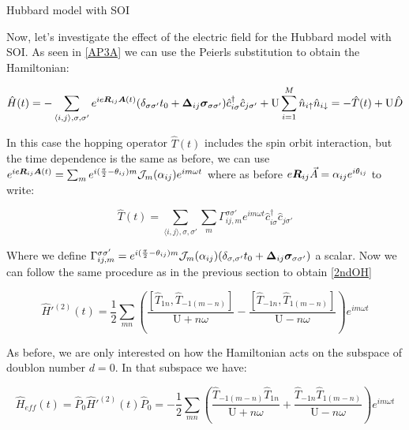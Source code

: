 \begin{section}{Hubbard model with SOI}

Now, let's investigate the effect of the electric field for the Hubbard model with SOI. As seen in \ref{AP3A} we can use the Peierls substitution to obtain the Hamiltonian:

\begin{equation}
\hat{H}(t) = -\sum_{\langle i,j \rangle, \sigma, \sigma'} e^{ie\boldsymbol{R}_{ij}\boldsymbol{A}(t)} (\delta_{\sigma \sigma'}t_0 + \boldsymbol{\Delta}_{ij}\boldsymbol{\sigma}_{\sigma \sigma'}) \hat{c}_{i \sigma}^\dagger \hat{c}_{j \sigma'} + \text{U} \sum_{i=1}^M \hat{n}_{i\uparrow}\hat{n}_{i\downarrow} = -\hat{T}(t) + \text{U}\hat{D}
\end{equation}

In this case the hopping operator $\hat{T}(t)$ includes the spin orbit interaction, but the time dependence is the same as before, we can use $e^{ie\boldsymbol{R}_{ij}\boldsymbol{A}(t)} =  \sum_m e^{i(\frac{\pi}{2}-\theta_{ij})m} \mathcal{J}_m(\alpha_{ij}) e^{im\omega t}$ where as before $e\boldsymbol{R}_{ij}\vec{A} = \alpha_{ij} e^{i \theta_{ij}}$ to write:

\begin{equation}
\hat{T}(t) = \sum_{\langle i,j \rangle, \sigma, \sigma'} \sum_m \Gamma_{ij,m}^{\sigma\sigma'} e^{im \omega t} \hat{c}_{i \sigma}^\dagger \hat{c}_{j \sigma'}
\end{equation}

Where we define $\Gamma_{ij,m}^{\sigma\sigma'} = e^{i(\frac{\pi}{2}-\theta_{ij})m} \mathcal{J}_m(\alpha_{ij})(\delta_{\sigma, \sigma'}t_0+\boldsymbol{\Delta}_{ij}\boldsymbol{\sigma}_{\sigma \sigma'})$ a scalar. Now we can follow the same procedure as in the previous section to obtain \ref{2ndOH}

\begin{equation}
\hat{H}'^{(2)}(t) = \frac{1}{2}\sum_{mn} \left( \frac{\left[\hat{T}_{1n}, \hat{T}_{-1(m-n)} \right]}{\text{U}+n\omega} - \frac{\left[\hat{T}_{-1n}, \hat{T}_{1(m-n)} \right]}{\text{U}-n\omega} \right) e^{im\omega t}
\end{equation}

As before, we are only interested on how the Hamiltonian acts on the subspace of doublon number $d=0$. In that subspace we have:

\begin{equation}
\hat{H}_{eff}(t) = \hat{P}_0 \hat{H}'^{(2)}(t)\hat{P}_0 = - \frac{1}{2}\sum_{mn} \left( \frac{\hat{T}_{-1(m-n)}\hat{T}_{1n}  }{\text{U}+n\omega} + \frac{\hat{T}_{-1n}\hat{T}_{1(m-n)}}{\text{U}-n\omega} \right) e^{im\omega t}
\end{equation}


\end{section}
